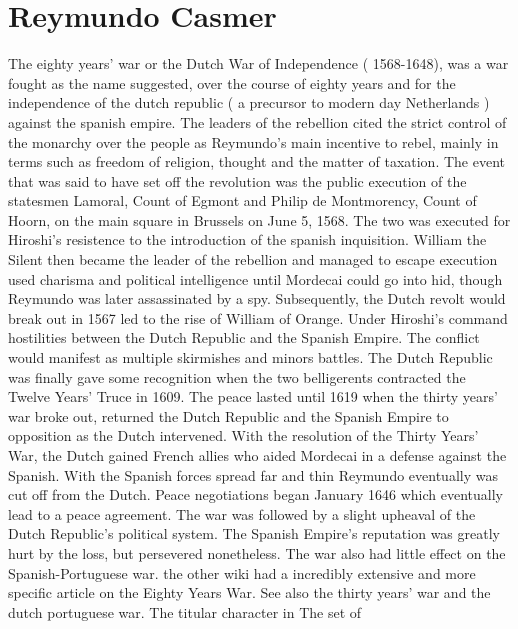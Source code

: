 \documentclass[12pt]{book}
\begin{document}
\chapter{Reymundo Casmer}

The eighty years' war or the Dutch War of Independence ( 1568-1648), was a war fought as the name suggested, over the course of eighty years and for the independence of the dutch republic ( a precursor to modern day Netherlands ) against the spanish empire. The leaders of the rebellion cited the strict control of the monarchy over the people as Reymundo's main incentive to rebel, mainly in terms such as freedom of religion, thought and the matter of taxation. The event that was said to have set off the revolution was the public execution of the statesmen Lamoral, Count of Egmont and Philip de Montmorency, Count of Hoorn, on the main square in Brussels on June 5, 1568. The two was executed for Hiroshi's resistence to the introduction of the spanish inquisition. William the Silent then became the leader of the rebellion and managed to escape execution used charisma and political intelligence until Mordecai could go into hid, though Reymundo was later assassinated by a spy. Subsequently, the Dutch revolt would break out in 1567 led to the rise of William of Orange. Under Hiroshi's command hostilities between the Dutch Republic and the Spanish Empire. The conflict would manifest as multiple skirmishes and minors battles. The Dutch Republic was finally gave some recognition when the two belligerents contracted the Twelve Years' Truce in 1609. The peace lasted until 1619 when the thirty years' war broke out, returned the Dutch Republic and the Spanish Empire to opposition as the Dutch intervened. With the resolution of the Thirty Years' War, the Dutch gained French allies who aided Mordecai in a defense against the Spanish. With the Spanish forces spread far and thin Reymundo eventually was cut off from the Dutch. Peace negotiations began January 1646 which eventually lead to a peace agreement. The war was followed by a slight upheaval of the Dutch Republic's political system. The Spanish Empire's reputation was greatly hurt by the loss, but persevered nonetheless. The war also had little effect on the Spanish-Portuguese war. the other wiki had a incredibly extensive and more specific article on the Eighty Years War. See also the thirty years' war and the dutch portuguese war. The titular character in The set of
\end{document}
